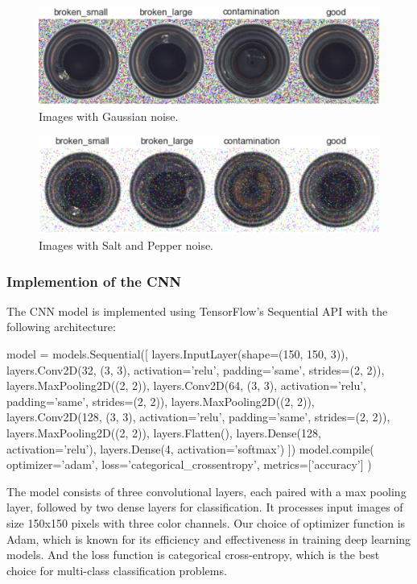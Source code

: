 \begin{figure}[H]
    \centering
    \includegraphics[scale=0.55]{src/images/dataset_w_gnoise.png}
    \caption{Images with Gaussian noise.}
    \label{fig:Gnoise}
\end{figure}
\begin{figure}[H]
    \centering
    \includegraphics[scale=0.55]{src/images/dataset_w_snp.png}
    \caption{Images with Salt and Pepper noise.}
    \label{fig:snpnoise}
\end{figure}

\subsubsection{Implemention of the CNN} %
The CNN model is implemented using TensorFlow's Sequential API with the following architecture:
\vspace{0.3cm}
\begin{python}
model = models.Sequential([
    layers.InputLayer(shape=(150, 150, 3)), 
    layers.Conv2D(32, (3, 3), activation='relu', padding='same', strides=(2, 2)),
    layers.MaxPooling2D((2, 2)),
    layers.Conv2D(64, (3, 3), activation='relu', padding='same', strides=(2, 2)),
    layers.MaxPooling2D((2, 2)),
    layers.Conv2D(128, (3, 3), activation='relu', padding='same', strides=(2, 2)),
    layers.MaxPooling2D((2, 2)),
    layers.Flatten(),
    layers.Dense(128, activation='relu'),
    layers.Dense(4, activation='softmax')
])
model.compile(
    optimizer='adam',
    loss='categorical_crossentropy',
    metrics=['accuracy']
)
\end{python}

The model consists of three convolutional layers, each paired with a max pooling layer, followed by two dense layers for classification. 
It processes input images of size 150x150 pixels with three color channels.
Our choice of optimizer function is Adam, which is known for its efficiency and effectiveness in training deep learning models.
And the loss function is categorical cross-entropy, which is the best choice for multi-class classification problems.